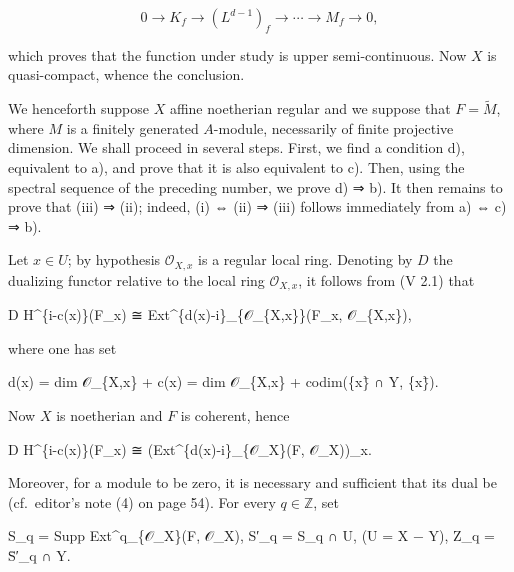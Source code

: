 \documentclass[
]{article}
\newenvironment{Shaded}{}{}
\newcommand{\NormalTok}[1]{#1}
\begin{document}
\[
0 \to K_{f} \to (L^{d-1})_{f} \to \cdots \to M_{f} \to 0,
\]

which proves that the function under study is upper semi-continuous. Now
\(X\) is quasi-compact, whence the conclusion.

We henceforth suppose \(X\) affine noetherian regular and we suppose
that \(F = \tilde{M}\), where \(M\) is a finitely generated
\(A\)-module, necessarily of finite projective dimension. We shall
proceed in several steps. First, we find a condition d), equivalent to
a), and prove that it is also equivalent to c). Then, using the spectral
sequence of the preceding number, we prove d) ⇒ b). It then remains to
prove that (iii) ⇒ (ii); indeed, (i) ⇔ (ii) ⇒ (iii) follows immediately
from a) ⇔ c) ⇒ b).

Let \(x \in U\); by hypothesis \(\mathcal{O}_{X,x}\) is a regular local
ring. Denoting by \(D\) the dualizing functor relative to the local ring
\(\mathcal{O}_{X,x}\), it follows from (V 2.1) that

\begin{Shaded}
\begin{Highlighting}[]
\NormalTok{D H\^{}\{i{-}c(x)\}(F\_x) ≅ Ext\^{}\{d(x){-}i\}\_\{𝒪\_\{X,x\}\}(F\_x, 𝒪\_\{X,x\}),}
\end{Highlighting}
\end{Shaded}

where one has set

\begin{Shaded}
\begin{Highlighting}[]
\NormalTok{d(x) = dim 𝒪\_\{X,x\} + c(x) = dim 𝒪\_\{X,x\} + codim(\{x\}̄ ∩ Y, \{x\}̄).}
\end{Highlighting}
\end{Shaded}

Now \(X\) is noetherian and \(F\) is coherent, hence

\begin{Shaded}
\begin{Highlighting}[]
\NormalTok{D H\^{}\{i{-}c(x)\}(F\_x) ≅ (Ext\^{}\{d(x){-}i\}\_\{𝒪\_X\}(F, 𝒪\_X))\_x.}
\end{Highlighting}
\end{Shaded}

Moreover, for a module to be zero, it is necessary and sufficient that
its dual be (cf.~editor's note (4) on page 54). For every
\(q \in \mathbb{Z}\), set

\begin{Shaded}
\begin{Highlighting}[]
\NormalTok{S\_q = Supp Ext\^{}q\_\{𝒪\_X\}(F, 𝒪\_X),}
\NormalTok{S′\_q = S\_q ∩ U,    (U = X − Y),}
\NormalTok{Z\_q = S̄′\_q ∩ Y.}
\end{Highlighting}
\end{Shaded}
\end{document}
